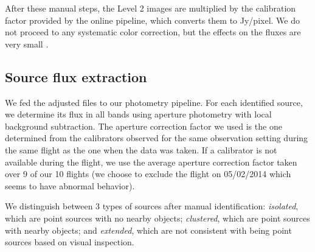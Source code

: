 After these manual steps, the Level 2 images are multiplied by the calibration factor provided by the online pipeline, which converts them to Jy/pixel. We do not proceed to any systematic color correction, but the effects on the fluxes are very small \citep{Herter:2013by}.

\subsection{Source flux extraction}
\label{sec:sourceFluxExtraction}

We fed the adjusted files to our photometry pipeline. For each identified source, we determine its flux in all bands using aperture photometry with local background subtraction. The aperture correction factor we used is the one determined from the calibrators observed for the same observation setting during the same flight as the one when the data was taken. If a calibrator is not available during the flight, we use the average aperture correction factor taken over 9 of our 10 flights (we choose to exclude the flight on 05/02/2014 which seems to have abnormal behavior).

We distinguish between 3 types of sources after manual identification: \textit{isolated}, which are point sources with no nearby objects; \textit{clustered}, which are point sources with nearby objects; and \textit{extended}, which are not consistent with being point sources based on visual inspection. 

